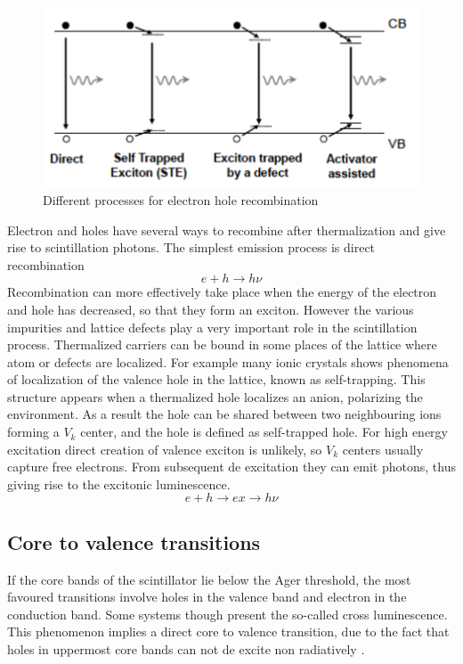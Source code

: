 \begin{figure}
\centering
\includegraphics[width=12cm]{../Pictures/Chapter_2/traps.pdf}
\caption[Electron hole recombination]{Different processes for electron hole recombination}
\label{fig:traps}
\end{figure}
Electron and holes have several ways to recombine after thermalization and give rise to scintillation photons.
The simplest emission process is direct recombination
\begin{equation}
e + h \rightarrow h\nu
\end{equation}
Recombination can more effectively take place when the energy of the electron and hole has decreased, so that they form an exciton. 
However the various impurities and lattice defects play a very important role in the scintillation process. Thermalized carriers can be bound in some places of the lattice where atom or defects are localized. 
For example many ionic crystals shows phenomena of localization of the valence hole in the lattice, known as self-trapping. This structure appears when a thermalized hole localizes an anion, polarizing the environment. As a result the hole can be shared between two neighbouring ions forming a $V_{k}$ center, and the hole is defined as self-trapped hole. For high energy excitation direct creation of valence exciton is unlikely, so $V_{k}$ centers usually capture free electrons. From subsequent de excitation they can emit photons, thus giving rise to the excitonic luminescence.
\begin{equation} 
e + h \rightarrow ex \rightarrow h\nu
\end{equation}

\subsection{Core to valence transitions}

If the core bands of the scintillator lie below the Ager threshold, the most favoured transitions involve holes in the valence band and electron in the conduction band. Some systems though present the so-called cross luminescence. This phenomenon implies a direct core to valence transition, due to the fact that holes in uppermost core bands can not de excite non radiatively \cite{Lecoq2006}. 

